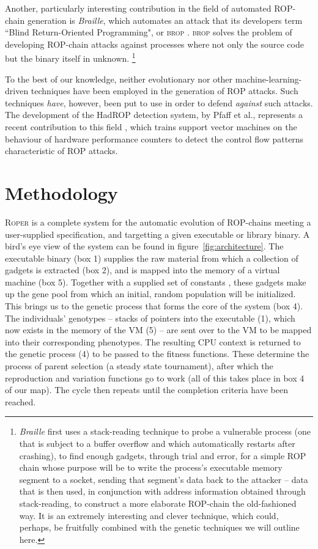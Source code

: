 Another, particularly interesting contribution in the field of
automated ROP-chain generation is \emph{Braille}, which
automates an attack that its developers term ``Blind
Return-Oriented Programming", or \textsc{brop} \cite{bittau14}.
\textsc{brop} solves the problem of developing ROP-chain
attacks against processes where not only the source code but the
binary itself in unknown.%
\footnote{\emph{Braille} first uses a stack-reading technique to probe a
vulnerable process (one that is subject to a buffer overflow and
which automatically restarts after crashing), to find enough
gadgets, through trial and error, for a simple ROP chain
whose purpose will be to write the process's executable memory
segment to a socket, sending that segment's data back to the
attacker -- data that is then used, in conjunction with address
information obtained through stack-reading, to construct a more
elaborate ROP-chain the old-fashioned way. It is an
extremely interesting and clever technique, which could, perhaps,
be fruitfully combined with the genetic techniques we will
outline here.} 

To the best of our knowledge, neither evolutionary nor other
machine-learning-driven techniques have been employed in the
generation of ROP attacks. Such techniques \emph{have}, however, been
put to use in order to defend \emph{against} such attacks. The
development of the HadROP detection system, by Pfaff et al.,
represents a recent contribution to this field \cite{pfaff15}, which
trains support vector machines on the behaviour of hardware
performance counters to detect the control flow patterns 
characteristic of ROP attacks.

\section{Methodology}\label{sec:methodology}

\textsc{Roper} is a complete system for the automatic evolution of
ROP-chains meeting a user-supplied specification, and targetting a
given executable or library binary. A bird's eye view of the system
can be found in figure~\ref{fig:architecture}. The executable binary
(box 1) supplies the raw material from which a collection of gadgets
is extracted (box 2), and is mapped into the memory of a virtual
machine (box 5). Together with a supplied set of constants , these
gadgets make up the gene pool from which an initial, random population
will be initialized. This brings us to the genetic process that forms
the core of the system (box 4). The individuals' genotypes -- stacks
of pointers into the executable (1), which now exists in the memory of
the VM (5) -- are sent over to the VM to be mapped into their
corresponding phenotypes. The resulting CPU context is returned to the
genetic process (4) to be passed to the fitness functions. These
determine the process of parent selection (a steady state tournament),
after which the reproduction and variation functions go to work (all
of this takes place in box 4 of our map). The cycle then repeats until
the completion criteria have been reached.

